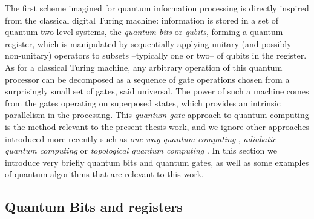 The first scheme imagined for quantum information processing is directly inspired from the classical digital Turing machine: information is stored in a set of quantum two level systems, the {\it quantum bits} or {\it qubits}, forming a quantum register, which is manipulated by sequentially applying unitary (and possibly non-unitary) operators to subsets --typically one or two-- of qubits in the register. As for a classical Turing machine, any arbitrary operation of this quantum processor can be decomposed as a sequence of gate operations chosen from a surprisingly small set of gates, said universal. The power of such a machine comes from the gates operating on superposed states, which provides an intrinsic parallelism in the processing.
\smallskip
This {\it quantum gate} approach to quantum computing is the method relevant to the present thesis work, and we ignore other approaches introduced more recently such as {\it one-way quantum computing} \citep{raussendorf_one-way_2001}, {\it adiabatic quantum computing} \citep{farhi_quantum_2000} or {\it topological quantum computing} \citep{kitaev_fault-tolerant_2003}. In this section we introduce very briefly quantum bits and quantum gates, as well as some examples of quantum algorithms that are relevant to this work.


\subsection{Quantum Bits and registers}

